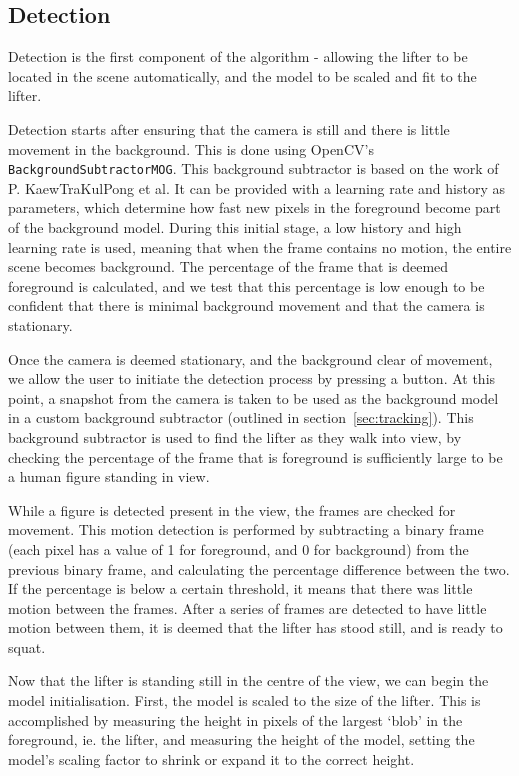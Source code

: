 \subsection{Detection}

Detection is the first component of the algorithm - allowing the lifter to be located in the scene automatically, and the model to be scaled and fit to the lifter.

Detection starts after ensuring that the camera is still and there is little movement in the background. This is done using OpenCV's \verb!BackgroundSubtractorMOG!. This background subtractor is based on the work of P. KaewTraKulPong et al\cite{backgroundsubmog}. It can be provided with a learning rate and history as parameters, which determine how fast new pixels in the foreground become part of the background model. During this initial stage, a low history and high learning rate is used, meaning that when the frame contains no motion, the entire scene becomes background. The percentage of the frame that is deemed foreground is calculated, and we test that this percentage is low enough to be confident that there is minimal background movement and that the camera is stationary.

Once the camera is deemed stationary, and the background clear of movement, we allow the user to initiate the detection process by pressing a button. At this point, a snapshot from the camera is taken to be used as the background model in a custom background subtractor (outlined in section~\ref{sec:tracking}). This background subtractor is used to find the lifter as they walk into view, by checking the percentage of the frame that is foreground is sufficiently large to be a human figure standing in view. 

While a figure is detected present in the view, the frames are checked for movement. This motion detection is performed by subtracting a binary frame (each pixel has a value of 1 for foreground, and 0 for background) from the previous binary frame, and calculating the percentage difference between the two. If the percentage is below a certain threshold, it means that there was little motion between the frames. After a series of frames are detected to have little motion between them, it is deemed that the lifter has stood still, and is ready to squat.

Now that the lifter is standing still in the centre of the view, we can begin the model initialisation. First, the model is scaled to the size of the lifter. This is accomplished by measuring the height in pixels of the largest `blob' in the foreground, ie. the lifter, and measuring the height of the model, setting the model's scaling factor to shrink or expand it to the correct height.

